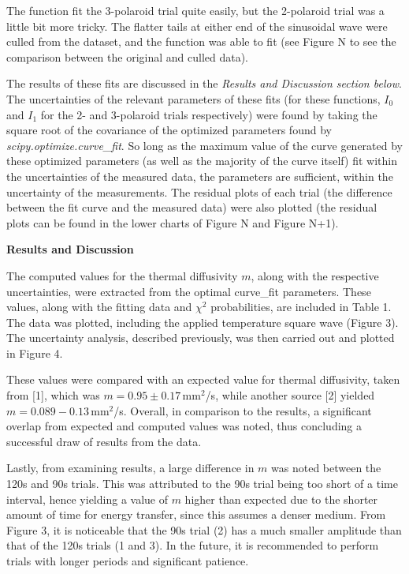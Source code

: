 \documentclass[11pt]{article}
\begin{document}
\begin{multicols}{2}
    The function fit the 3-polaroid trial quite easily, but the 2-polaroid trial was a little bit more tricky. The flatter tails at either end of the sinusoidal wave were culled from the dataset, and the function was able to fit (see Figure N to see the comparison between the original and culled data). 

    The results of these fits are discussed in the \textit{Results and Discussion section below}. The uncertainties of the relevant parameters of these fits (for these functions, $I_0$ and $I_1$ for the 2- and 3-polaroid trials respectively) were found by taking the square root of the covariance of the optimized parameters found by \textit{scipy.optimize.curve\_fit}. So long as the maximum value of the curve generated by these optimized parameters (as well as the majority of the curve itself) fit within the uncertainties of the measured data, the parameters are sufficient, within the uncertainty of the measurements. The residual plots of each trial (the difference between the fit curve and the measured data) were also plotted (the residual plots can be found in the lower charts of Figure N and Figure N+1).
    
    
    \vspace{10pt}

     \selectfont \textbf{Results and Discussion}
    
     \selectfont The computed values for the thermal diffusivity $m$, along with the respective uncertainties, were extracted from the optimal curve\_fit parameters. These values, along with the fitting data and $\chi^2$ probabilities, are included in Table 1. The data was plotted, including the applied temperature square wave (Figure 3). The uncertainty analysis, described previously, was then carried out and plotted in Figure 4.

    These values were compared with an expected value for thermal diffusivity, taken from [1], which was $m = 0.95\pm 0.17 \,$mm$^2$/s, while another source [2] yielded\\  $m = 0.089 - 0.13\,$mm$^2$/s. Overall, in comparison to the results, a significant overlap from expected and computed values was noted, thus concluding a successful draw of results from the data. 
    
    Lastly, from examining results, a large difference in $m$ was noted between the 120s and 90s trials. This was attributed to the 90s trial being too short of a time interval, hence yielding a value of $m$ higher than expected due to the shorter amount of time for energy transfer, since this assumes a denser medium. From Figure 3, it is noticeable that the 90s trial (2) has a much smaller amplitude than that of the 120s trials (1 and 3). In the future, it is recommended to perform trials with longer periods and significant patience.   



\end{multicols}
\end{document}
